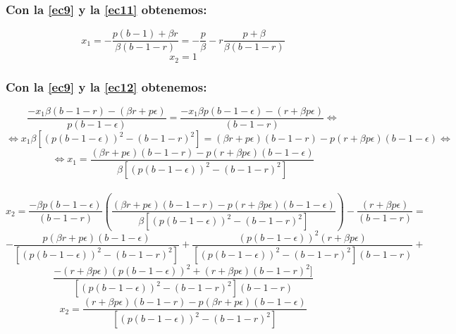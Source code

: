 \documentclass[11pt]{article}
\begin{document}
\subsubsection*{Con la \autoref{ec9} y la \autoref{ec11} obtenemos:}
\vspace{-0.5cm}
\begin{equation}\label{ec27}
x_1=-\dfrac{p(b-1)+\beta r}{\beta(b-1-r)}=-\dfrac{p}{\beta}-r\dfrac{p+\beta}{\beta(b-1-r)}
\end{equation}
\begin{equation}\label{ec28}
x_2=1
\end{equation}


\subsubsection*{Con la \autoref{ec9} y la \autoref{ec12} obtenemos:}
\vspace{-0.5cm}
\begin{equation*}
\dfrac{-x_1\beta(b-1-r)-(\beta r+p\epsilon)}{p(b-1-\epsilon)}=\dfrac{-x_1\beta p(b-1-\epsilon)-(r+\beta p\epsilon)}{(b-1-r)}\Longleftrightarrow
\end{equation*}
\begin{equation*}
\Longleftrightarrow x_1\beta[(p(b-1-\epsilon))^2-(b-1-r)^2]=(\beta r+p\epsilon)(b-1-r)-p(r+\beta p\epsilon)(b-1-\epsilon)\Longleftrightarrow
\end{equation*}
\begin{equation}\label{ec29}
\Longleftrightarrow x_1=\dfrac{(\beta r+p\epsilon)(b-1-r)-p(r+\beta p\epsilon)(b-1-\epsilon)}{\beta[(p(b-1-\epsilon))^2-(b-1-r)^2]}
\end{equation}\\
\begin{equation*}
x_2=\dfrac{-\beta p(b-1-\epsilon)}{(b-1-r)}\left(\dfrac{(\beta r+p\epsilon)(b-1-r)-p(r+\beta p\epsilon)(b-1-\epsilon)}{\beta[(p(b-1-\epsilon))^2-(b-1-r)^2]}\right)-\dfrac{(r+\beta p\epsilon)}{(b-1-r)}=
\end{equation*}
\begin{equation*}
-\dfrac{p(\beta r+p\epsilon)(b-1-\epsilon)}{[(p(b-1-\epsilon))^2-(b-1-r)^2]}+\dfrac{(p(b-1-\epsilon))^2(r+\beta p\epsilon)}{[(p(b-1-\epsilon))^2-(b-1-r)^2](b-1-r)}+
\end{equation*}
\begin{equation*}
\dfrac{-(r+\beta p\epsilon)(p(b-1-\epsilon))^2+(r+\beta p\epsilon)(b-1-r)^2]}{[(p(b-1-\epsilon))^2-(b-1-r)^2](b-1-r)}
\end{equation*}
\begin{equation}\label{ec30}
x_2=\dfrac{(r+\beta p\epsilon)(b-1-r)-p(\beta r+p\epsilon)(b-1-\epsilon)}{[(p(b-1-\epsilon))^2-(b-1-r)^2]}
\end{equation}
\end{document}
